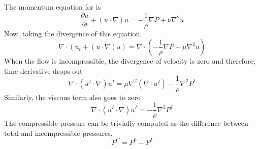 \documentclass[12pt, a4paper]{report}
\begin{document}
The momentum equation for is
\begin{equation}
    \frac{\partial u}{\partial t} + (u \cdot \nabla) u = -\frac{1}{\rho}\nabla{P} + \nu \nabla^2u
\end{equation}
Now, taking the divergence of this equation,
\begin{equation}
    \nabla \cdot(u_t + (u\cdot\nabla)u) = \nabla\cdot{(-\frac{1}{\rho}\nabla{P} + \mu \nabla^2u)}
\end{equation}
When the flow is incompressible, the divergence of velocity is zero and therefore, time derivative drops out
\begin{equation}
    \nabla\cdot(u^I\cdot\nabla)u^I = \mu\nabla^2(\nabla\cdot u^I) - \frac{1}{\rho}\nabla^2{P^I}
\end{equation}
Similarly, the viscous term also goes to zero
\begin{equation}
    \nabla\cdot(u^I\cdot\nabla)u^I = - \frac{1}{\rho}\nabla^2{P^I}
\end{equation}
The compressible pressure can be trivially computed as the difference between total and incompressible pressures,
\begin{equation}
    P^C = P^0 - P^I
\end{equation}
\end{document}
